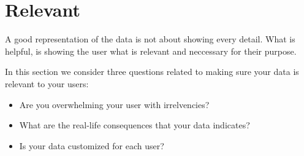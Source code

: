 \section{Relevant}

A good representation of the data is not about showing every detail. What is helpful, is showing the user what is relevant and neccessary for their purpose.

In this section we consider three questions related to making sure your data is relevant to your users:

\begin{itemize}
    \item Are you overwhelming your user with irrelvencies?
    \item What are the real-life consequences that your data indicates?
    \item Is your data customized for each user?
\end{itemize}



